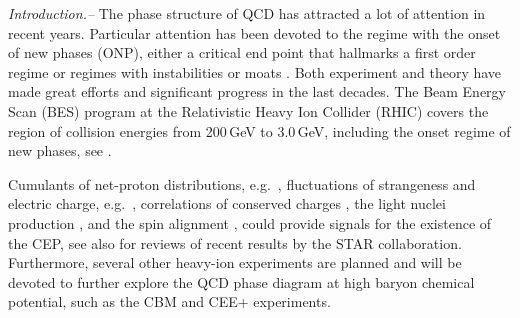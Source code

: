 \documentclass[reprint,twocolumn,superscriptaddress,preprintnumbers,amsmath,amssymb,aps,prd,floatfix]{revtex4-2}
\begin{document}
\maketitle

\emph{Introduction.--} 
%
The phase structure of QCD has attracted a lot of attention in recent years. Particular attention has been devoted to the regime with the onset of new phases (ONP), either a critical end point that hallmarks a first order regime or regimes with instabilities or moats \cite{Fu:2019hdw, Pisarski:2021qof, Pawlowski:2025jpg}. Both experiment and theory have made great efforts and significant progress in the last decades. The Beam Energy Scan (BES) program at the Relativistic Heavy Ion Collider (RHIC) covers the region of collision energies from 200\,GeV to 3.0\,GeV, including the onset regime of new phases, see \cite{Fu:2019hdw, Gao:2020fbl, Gunkel:2021oya, Pawlowski:2025jpg}. 

Cumulants of net-proton distributions, e.g.~\cite{STAR:2020tga, STAR:2021iop, STAR:2021rls, STAR:2021fge, STAR:2022vlo, STAR:2025zdq}, fluctuations of strangeness and electric charge, e.g.~\cite{Adamczyk:2017wsl, Pandav:2020uzx}, correlations of conserved charges \cite{STAR:2019ans}, the light nuclei production \cite{STAR:2022hbp, STAR:2023uxk}, and the spin alignment \cite{STAR:2022fan}, could provide signals for the existence of the CEP, see also \cite{Luo:2017faz, Pandav:2022xxx, Aparin:2022jok, Zhang:2026dny} for  reviews of  recent results by the STAR collaboration. Furthermore, several other heavy-ion experiments are planned and will be devoted to further explore the QCD phase diagram at high baryon chemical potential, such as the CBM \cite{CBM:2016kpk} and CEE+ \cite{Ruan:2018fpo} experiments.
\end{document}
